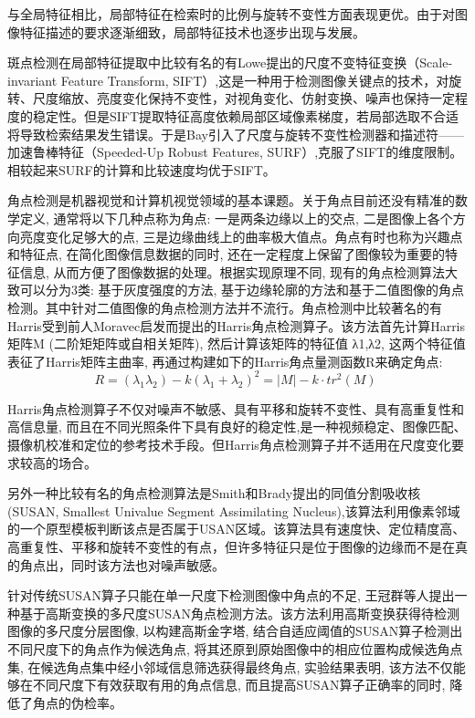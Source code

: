 \documentclass[bachelor_p]{hdu-thesis}
\begin{document}
与全局特征相比，局部特征在检索时的比例与旋转不变性方面表现更优。由于对图像特征描述的要求逐渐细致，局部特征技术也逐步出现与发展。

斑点检测在局部特征提取中比较有名的有Lowe\citep{SIFT}提出的尺度不变特征变换（Scale-invariant Feature Transform, SIFT）,这是一种用于检测图像关键点的技术，对旋转、尺度缩放、亮度变化保持不变性，对视角变化、仿射变换、噪声也保持一定程度的稳定性。但是SIFT提取特征高度依赖局部区域像素梯度，若局部选取不合适将导致检索结果发生错误。于是Bay\citep{SURF}引入了尺度与旋转不变性检测器和描述符——加速鲁棒特征（Speeded-Up Robust Features, SURF）,克服了SIFT的维度限制。相较起来SURF的计算和比较速度均优于SIFT。

角点检测是机器视觉和计算机视觉领域的基本课题。关于角点目前还没有精准的数学定义, 通常将以下几种点称为角点: 一是两条边缘以上的交点, 二是图像上各个方向亮度变化足够大的点, 三是边缘曲线上的曲率极大值点。角点有时也称为兴趣点和特征点, 在简化图像信息数据的同时, 还在一定程度上保留了图像较为重要的特征信息, 从而方便了图像数据的处理。根据实现原理不同, 现有的角点检测算法大致可以分为3类: 基于灰度强度的方法, 基于边缘轮廓的方法和基于二值图像的角点检测。其中针对二值图像的角点检测方法并不流行\citep{CORNER}。角点检测中比较著名的有Harris\citep{HARRIS}受到前人Moravec\citep{MORAVEC}启发而提出的Harris角点检测算子。该方法首先计算Harris矩阵M (二阶矩矩阵或自相关矩阵), 然后计算该矩阵的特征值 λ1,λ2, 这两个特征值表征了Harris矩阵主曲率, 再通过构建如下的Harris角点量测函数R来确定角点:
\begin{equation}
  R = ({\lambda _1}{\lambda _2}) - k{({\lambda _1} + {\lambda _2})^2} = \left| M \right| - k \cdot t{r^2}(M)\;
\end{equation}

Harris角点检测算子不仅对噪声不敏感、具有平移和旋转不变性、具有高重复性和高信息量, 而且在不同光照条件下具有良好的稳定性,是一种视频稳定、图像匹配、摄像机校准和定位的参考技术手段。但Harris角点检测算子并不适用在尺度变化要求较高的场合\citep{CORNER}。

另外一种比较有名的角点检测算法是Smith和Brady\citep{Smith}提出的同值分割吸收核(SUSAN, Smallest Univalue Segment Assimilating Nucleus),该算法利用像素邻域的一个原型模板判断该点是否属于USAN区域。该算法具有速度快、定位精度高、高重复性、平移和旋转不变性的有点，但许多特征只是位于图像的边缘而不是在真的角点出，同时该方法也对噪声敏感。

针对传统SUSAN算子只能在单一尺度下检测图像中角点的不足, 王冠群\citep{CROWN}等人提出一种基于高斯变换的多尺度SUSAN角点检测方法。该方法利用高斯变换获得待检测图像的多尺度分层图像, 以构建高斯金字塔, 结合自适应阈值的SUSAN算子检测出不同尺度下的角点作为候选角点, 将其还原到原始图像中的相应位置构成候选角点集, 在候选角点集中经小邻域信息筛选获得最终角点, 实验结果表明, 该方法不仅能够在不同尺度下有效获取有用的角点信息, 而且提高SUSAN算子正确率的同时, 降低了角点的伪检率\citep{CORNER}。
\end{document}
